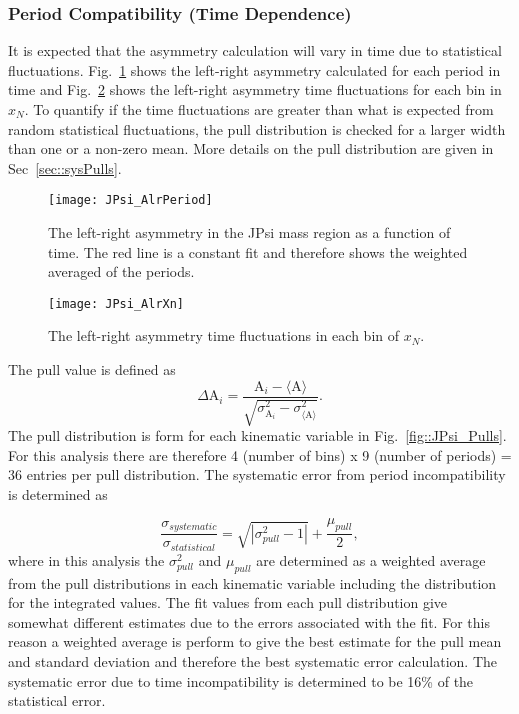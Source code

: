 \subsubsection{Period Compatibility (Time Dependence)}
It is expected that the asymmetry calculation will vary in time due to
statistical fluctuations.  Fig.~\ref{fig::JPsi_AlrPeriod} shows the left-right
asymmetry calculated for each period in time and Fig.~\ref{fig::JPsi_AlrXn}
shows the left-right asymmetry time fluctuations for each bin in $x_N$.  To
quantify if the time fluctuations are greater than what is expected from random
statistical fluctuations, the pull distribution is checked for a larger width
than one or a non-zero mean.  More details on the pull distribution are given in
Sec~\ref{sec::sysPulls}.

\begin{figure}[h!t]
  \centering \texttt{[image: JPsi\_AlrPeriod]}
  \caption{The left-right asymmetry in the JPsi mass region as a function of
    time.  The red line is a constant fit and therefore shows the weighted
    averaged of the periods.}
  \label{fig::JPsi_AlrPeriod}
\end{figure}

\begin{figure}[h!t]
  \centering
  \texttt{[image: JPsi\_AlrXn]}
  \caption{The left-right asymmetry time fluctuations in each bin of $x_N$.}
  \label{fig::JPsi_AlrXn}
\end{figure}

The pull value is defined as
\begin{equation}
  \label{eq::pullJPsi}
  \Delta\mathrm{A}_i =
  \frac{
    \mathrm{A}_i - \langle \mathrm{A} \rangle
  }{
    \sqrt{
      \sigma^2_{\mathrm{A}_i} - \sigma^2_{\langle \mathrm{A} \rangle}
    }
  }.
\end{equation}
\noindent
The pull distribution is form for each kinematic variable in
Fig.~\ref{fig::JPsi_Pulls}.  For this analysis there are therefore 4 (number of
bins) x 9 (number of periods) = 36 entries per pull distribution.  The
systematic error from period incompatibility is determined as

\begin{equation}
  \label{equ::sysErrorPullJPsi}
  \frac{\sigma_{systematic}}{\sigma_{statistical}} =
  \sqrt{|\sigma^2_{pull} - 1|} + \frac{\mu_{pull}}{2},
\end{equation}
\noindent
where in this analysis the $\sigma_{pull}^2$ and $\mu_{pull}$ are determined as
a weighted average from the pull distributions in each kinematic variable
including the distribution for the integrated values.  The fit values from each
pull distribution give somewhat different estimates due to the errors associated
with the fit.  For this reason a weighted average is perform to give the best
estimate for the pull mean and standard deviation and therefore the best
systematic error calculation.  The systematic error due to time incompatibility
is determined to be 16\% of the statistical error.

